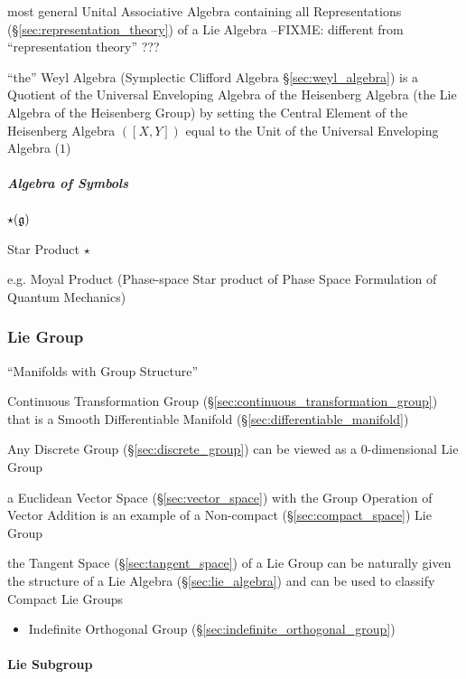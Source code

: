 most general Unital Associative Algebra containing all Representations
(\S\ref{sec:representation_theory}) of a Lie Algebra
--FIXME: different from ``representation theory'' ???

\fist ``the'' Weyl Algebra (Symplectic Clifford Algebra
\S\ref{sec:weyl_algebra}) is a Quotient of the Universal Enveloping Algebra of
the Heisenberg Algebra (the Lie Algebra of the Heisenberg Group) by setting the
Central Element of the Heisenberg Algebra $([X,Y])$ equal to the Unit of the
Universal Enveloping Algebra ($1$)



\subparagraph{Algebra of Symbols}\label{sec:symbol_algebra}\hfill

$\star(\mathfrak{g})$

Star Product $\star$

e.g. Moyal Product (Phase-space Star product of Phase Space Formulation of
Quantum Mechanics)



\subsubsection{Lie Group}\label{sec:lie_group}

``Manifolds with Group Structure''

Continuous Transformation Group
(\S\ref{sec:continuous_transformation_group}) that is a Smooth
Differentiable Manifold (\S\ref{sec:differentiable_manifold})

Any Discrete Group (\S\ref{sec:discrete_group}) can be viewed as a
$0$-dimensional Lie Group %

a Euclidean Vector Space (\S\ref{sec:vector_space}) with the Group Operation of
Vector Addition is an example of a Non-compact (\S\ref{sec:compact_space}) Lie
Group

the Tangent Space (\S\ref{sec:tangent_space}) of a Lie Group can be naturally
given the structure of a Lie Algebra (\S\ref{sec:lie_algebra}) and can be used
to classify Compact Lie Groups

\begin{itemize}
  \item Indefinite Orthogonal Group (\S\ref{sec:indefinite_orthogonal_group})
\end{itemize}



\paragraph{Lie Subgroup}\label{sec:lie_subgroup}\hfill

